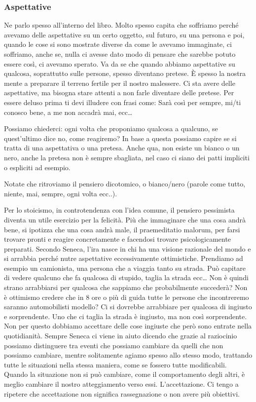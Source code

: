 \documentclass[12pt]{book} %
\begin{document}
\subsubsection{Aspettative}
Ne parlo spesso all'interno del libro. Molto spesso capita che soffriamo perché avevamo delle
aspettative su un certo oggetto, sul futuro, su una persona e poi, quando le cose si sono mostrate diverse da come le avevamo
immaginate, ci soffriamo, anche se, nulla ci avesse dato modo di pensare che sarebbe potuto essere così, ci avevamo
sperato. Va da se che quando abbiamo aspettative su qualcosa, soprattutto sulle persone, spesso diventano pretese. È spesso
la nostra mente a preparare il terreno fertile per il nostro malessere.
Ci sta avere delle aspettative, ma bisogna stare attenti a non farle diventare delle pretese. 
Per essere deluso prima ti devi illudere con frasi come: Sarà così per sempre, mi/ti conosco bene, a me non accadrà mai, ecc…

Possiamo chiederci: ogni volta che proponiamo qualcosa a qualcuno, se quest'ultimo dice no, come reagiremo? In base a
questa possiamo capire se si tratta di una aspettativa o una pretesa. Anche qua, non esiste un bianco o un nero, anche
la pretesa non è sempre sbagliata, nel caso ci siano dei patti impliciti o espliciti ad esempio.

Notate che ritroviamo il pensiero dicotomico, o bianco/nero (parole come tutto, niente, mai, sempre, ogni volta ecc..).

Per lo stoicismo, in controtendenza con l'idea comune, il pensiero pessimista diventa un utile
esercizio per la felicità. Più che immaginare che una cosa andrà bene, si ipotizza che una cosa andrà male, il praemeditatio malorum, per farsi
trovare pronti e reagire concretamente e facendosi trovare psicologicamente preparati. Secondo Seneca, l'ira nasce in chi ha una visione razionale del mondo e si arrabbia perché nutre aspettative eccessivamente ottimistiche. Prendiamo ad esempio un
camionista, una persona che a viaggia tanto su strada. Può capitare di vedere qualcuno che fa qualcosa di stupido,
taglia la strada ecc… Non è quindi strano arrabbiarsi per qualcosa che sappiamo che probabilmente succederà? Non è
ottimismo credere che in 8 ore o più di guida tutte le persone che incontreremo saranno automobilisti modello? Ci si dovrebbe
arrabbiare per qualcosa di ingiusto e sorprendente. Uno che ci taglia la strada è ingiusto, ma non così
sorprendente. Non per questo dobbiamo accettare delle cose ingiuste che però sono entrate nella quotidianità. Sempre
Seneca ci viene in aiuto dicendo che grazie al raziocinio possiamo distinguere tra eventi che possiamo cambiare da
quelli che non possiamo cambiare, mentre solitamente agiamo spesso allo stesso modo, trattando tutte le situazioni nella stessa maniera, come se fossero tutte modificabili. Quando la situazione non si può cambiare, come il comportamento degli
altri, è meglio cambiare il nostro atteggiamento verso essi. L'accettazione. Ci
tengo a ripetere che accettazione non significa rassegnazione o non avere più obiettivi.
\end{document}
